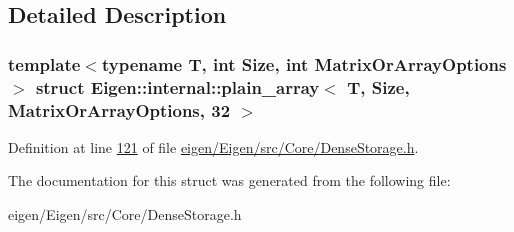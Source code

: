 \subsection{Detailed Description}
\subsubsection*{template$<$typename T, int Size, int Matrix\+Or\+Array\+Options$>$\newline
struct Eigen\+::internal\+::plain\+\_\+array$<$ T, Size, Matrix\+Or\+Array\+Options, 32 $>$}



Definition at line \hyperlink{eigen_2_eigen_2src_2_core_2_dense_storage_8h_source_l00121}{121} of file \hyperlink{eigen_2_eigen_2src_2_core_2_dense_storage_8h_source}{eigen/\+Eigen/src/\+Core/\+Dense\+Storage.\+h}.



The documentation for this struct was generated from the following file\+:\begin{DoxyCompactItemize}
\item 
eigen/\+Eigen/src/\+Core/\+Dense\+Storage.\+h\end{DoxyCompactItemize}
